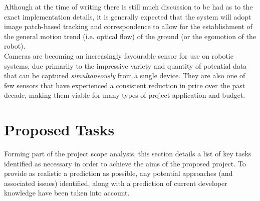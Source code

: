 \documentclass[10pt,fleqn,twoside]{article}
\begin{document}
Although at the time of writing there is still much discussion to be had as to the exact implementation details, it is generally expected that the system will adopt image patch-based tracking and correspondence to allow for the establishment of the general motion trend (i.e. optical flow) of the ground (or the egomotion of the robot). \\

Cameras are becoming an increasingly favourable sensor for use on robotic systems, due primarily to the impressive variety and quantity of potential data that can be captured \textit{simultaneously} from a single device. They are also one of few sensors that have experienced a consistent reduction in price over the past decade, making them viable for many types of project application and budget.



\section{Proposed Tasks}

Forming part of the project scope analysis, this section details a list of key tasks identified as necessary in order to achieve the aims of the proposed project. To provide as realistic a prediction as possible, any  potential approaches (and associated issues) identified, along with a prediction of current developer knowledge have been taken into account.
\end{document}
